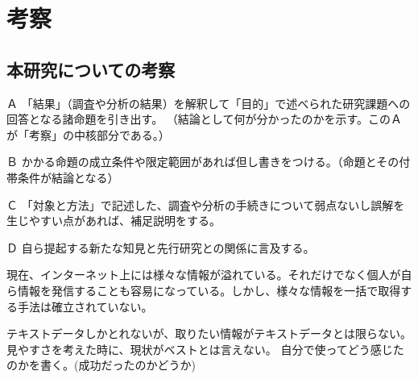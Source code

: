 \chapter{考察}
\label{chap:consideration}

\section{本研究についての考察}
Ａ 「結果」（調査や分析の結果）を解釈して「目的」で述べられた研究課題への回答となる諸命題を引き出す。
（結論として何が分かったのかを示す。このＡが「考察」の中核部分である。）

Ｂ かかる命題の成立条件や限定範囲があれば但し書きをつける。（命題とその付帯条件が結論となる）

Ｃ 「対象と方法」で記述した、調査や分析の手続きについて弱点ないし誤解を生じやすい点があれば、補足説明をする。

Ｄ 自ら提起する新たな知見と先行研究との関係に言及する。

現在、インターネット上には様々な情報が溢れている。それだけでなく個人が自ら情報を発信することも容易になっている。しかし、様々な情報を一括で取得する手法は確立されていない。

テキストデータしかとれないが、取りたい情報がテキストデータとは限らない。
見やすさを考えた時に、現状がベストとは言えない。
自分で使ってどう感じたのかを書く。(成功だったのかどうか)
